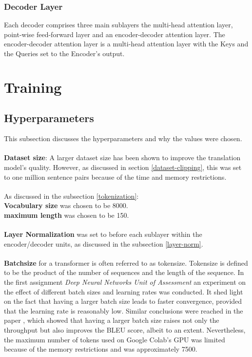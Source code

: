 \documentclass[12pt,a4paper,twoside,openright]{report}
\begin{document}
\subsubsection{Decoder Layer}
Each decoder comprises three main sublayers the multi-head attention layer, point-wise feed-forward layer and an encoder-decoder attention layer. The encoder-decoder attention layer is a multi-head attention layer with the Keys and the Queries set to the Encoder's output. 


\section{Training}
\label{training}

\subsection{Hyperparameters}
\label{hyperparameters}

This subsection discusses the hyperparameters and why the values were chosen. 
\\\\
\textbf{Dataset size}: A larger dataset size has been shown to improve the translation model's quality. However, as discussed in section \ref{dataset-clipping}, this was set to one million sentence pairs because of the time and memory restrictions.  
\\\\
As discussed in the subsection \ref{tokenization}:\\
\textbf{Vocabulary size} was chosen to be 8000.
\\
\textbf{maximum length} was chosen to be 150.
\\\\
\textbf{Layer Normalization} was set to before each sublayer within the encoder/decoder units, as discussed in the subsection \ref{layer-norm}.
\\\\
\textbf{Batchsize} for a transformer is often referred to as tokensize. Tokensize is defined to be the product of the number of sequences and the length of the sequence. In the first assignment \textit{Deep Neural Networks Unit of Assessment} an experiment on the effect of different batch sizes and learning rates was conducted. It shed light on the fact that having a larger batch size leads to faster convergence, provided that the learning rate is reasonably low. Similar conclusions were reached in the paper \cite{training-tips}, which showed that having a larger batch size raises not only the throughput but also improves the BLEU score, albeit to an extent. Nevertheless, the maximum number of tokens used on Google Colab's GPU was limited because of the memory restrictions and was approximately 7500. 
\end{document}
